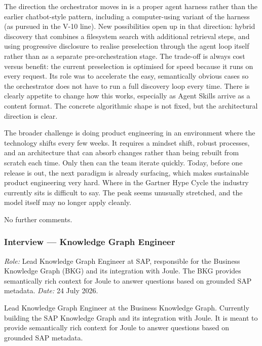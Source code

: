 The direction the orchestrator moves in is a proper agent harness rather than the earlier chatbot-style pattern, including a computer-using variant of the harness (as pursued in the V-10 line). New possibilities open up in that direction: hybrid discovery that combines a filesystem search with additional retrieval steps, and using progressive disclosure to realise preselection through the agent loop itself rather than as a separate pre-orchestration stage. The trade-off is always cost versus benefit: the current preselection is optimised for speed because it runs on every request. Its role was to accelerate the easy, semantically obvious cases so the orchestrator does not have to run a full discovery loop every time. There is clearly appetite to change how this works, especially as Agent Skills arrive as a content format. The concrete algorithmic shape is not fixed, but the architectural direction is clear.

The broader challenge is doing product engineering in an environment where the technology shifts every few weeks. It requires a mindset shift, robust processes, and an architecture that can absorb changes rather than being rebuilt from scratch each time. Only then can the team iterate quickly. Today, before one release is out, the next paradigm is already surfacing, which makes sustainable product engineering very hard. Where in the Gartner Hype Cycle the industry currently sits is difficult to say. The peak seems unusually stretched, and the model itself may no longer apply cleanly.

\medskip{}

No further comments.

\subsubsection{Interview --- Knowledge Graph Engineer}

\noindent\textit{Role:} Lead Knowledge Graph Engineer at SAP, responsible for the Business Knowledge Graph (BKG) and its integration with Joule. The BKG provides semantically rich context for Joule to answer questions based on grounded SAP metadata. \textit{Date:} 24 July 2026.

\medskip{}

Lead Knowledge Graph Engineer at the Business Knowledge Graph. Currently building the SAP Knowledge Graph and its integration with Joule. It is meant to provide semantically rich context for Joule to answer questions based on grounded SAP metadata.

